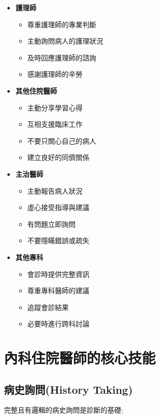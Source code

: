 \documentclass[12pt,a4paper]{article}
\begin{document}
\begin{itemize}[leftmargin=*]
\item \textbf{護理師}
\begin{itemize}
\item 尊重護理師的專業判斷
\item 主動詢問病人的護理狀況
\item 及時回應護理師的諮詢
\item 感謝護理師的辛勞
\end{itemize}

\item \textbf{其他住院醫師}
\begin{itemize}
\item 主動分享學習心得
\item 互相支援臨床工作
\item 不要只關心自己的病人
\item 建立良好的同儕關係
\end{itemize}

\item \textbf{主治醫師}
\begin{itemize}
\item 主動報告病人狀況
\item 虛心接受指導與建議
\item 有問題立即詢問
\item 不要隱瞞錯誤或疏失
\end{itemize}

\item \textbf{其他專科}
\begin{itemize}
\item 會診時提供完整資訊
\item 尊重專科醫師的建議
\item 追蹤會診結果
\item 必要時進行跨科討論
\end{itemize}
\end{itemize}

\newpage

\section{內科住院醫師的核心技能}

\subsection{病史詢問(History Taking)}

完整且有邏輯的病史詢問是診斷的基礎:
\end{document}
